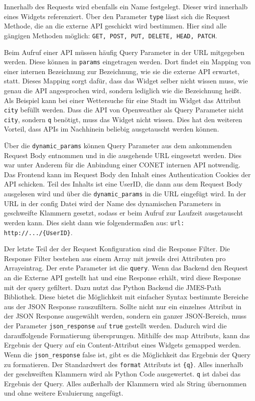 Innerhalb des Requests wird ebenfalls ein Name festgelegt. Dieser wird innerhalb eines Widgets referenziert. Über den Parameter \texttt{type} lässt sich die Request Methode, die an die externe API geschickt wird bestimmen. Hier sind alle gängigen Methoden möglich: \texttt{GET, POST, PUT, DELETE, HEAD, PATCH}.

Beim Aufruf einer API müssen häufig Query Parameter in der URL mitgegeben werden. Diese können in \texttt{params} eingetragen werden. Dort findet ein Mapping von einer internen Bezeichnung zur Bezeichnung, wie sie die externe API erwartet, statt. Dieses Mapping sorgt dafür, dass das Widget selber nicht wissen muss, wie genau die API angesprochen wird, sondern lediglich wie die Bezeichnung heißt. Als Beispiel kann bei einer Wettersuche für eine Stadt im Widget das Attribut \texttt{city} befüllt werden. Dass die API von Openweather als Query Parameter nicht \texttt{city}, sondern \texttt{q} benötigt, muss das Widget nicht wissen. Dies hat den weiteren Vorteil, dass APIs im Nachhinein beliebig ausgetauscht werden können. 

Über die \texttt{dynamic\_{}params} können Query Parameter aus dem ankommenden Request Body entnommen und in die ausgehende URL eingesetzt werden. Dies war unter Anderem für die Anbindung einer CONET internen API notwendig. Das Frontend kann im Request Body den Inhalt eines Authentication Cookies der API schicken. Teil des Inhalts ist eine UserID, die dann aus dem Request Body ausgelesen wird und über die \texttt{dynamic\_{}params} in die URL eingefügt wird. In der URL in der config Datei wird der Name des dynamischen Parameters in geschweifte Klammern gesetzt, sodass er beim Aufruf zur Laufzeit ausgetauscht werden kann. Dies sieht dann wie folgendermaßen aus:  \texttt{\glqq url\grqq{}: \glqq http://.../\{UserID\}\grqq{}}.

Der letzte Teil der der Request Konfiguration sind die Response Filter. Die Response Filter bestehen aus einem Array mit jeweils drei Attributen pro Arrayeintrag. Der erste Parameter ist die \texttt{query}. Wenn das Backend den Request an die Externe API gestellt hat und eine Response erhält, wird diese Response mit der query gefiltert. Dazu nutzt das Python Backend die JMES-Path Bibliothek. Diese bietet die Möglichkeit mit einfacher Syntax bestimmte Bereiche aus der JSON Response rauszufiltern. Sollte nicht nur ein einzelnes Attribut in der JSON Response ausgewählt werden, sondern ein ganzer JSON-Bereich, muss der Parameter \texttt{json\_{}response} auf \texttt{true} gestellt werden. Dadurch wird die darauffolgende Formatierung übersprungen. Mithilfe des \glqq map\grqq{} Attributs, kann das Ergebnis der Query auf ein Content-Attribut eines Widgets gemapped werden. Wenn die \texttt{json\_{}response} false ist, gibt es die Möglichkeit das Ergebnis der Query zu formatieren. Der Standardwert des \texttt{format} Attributs ist \texttt{\{q\}}. Alles innerhalb der geschweiften Klammern wird als Python Code ausgewertet. \texttt{q} ist dabei das Ergebnis der Query. Alles außerhalb der Klammern wird als String übernommen und ohne weitere Evaluierung angefügt. 

